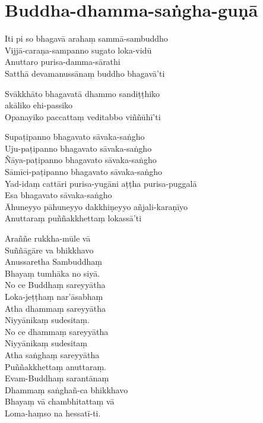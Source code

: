 \section{Buddha-dhamma-saṅgha-guṇā}


\begin{paritta}

Iti pi so bhagavā arahaṃ sammā-sambuddho\\
Vijjā-caraṇa-sampanno sugato loka-vidū\\
Anuttaro purisa-damma-sārathi\\
Satthā devamanussānaṃ buddho bhagavā'ti

Svākkhāto bhagavatā dhammo sandiṭṭhiko\\
\vin akāliko ehi-passiko\\
Opanayiko paccattaṃ veditabbo viññūhī'ti

Supaṭipanno bhagavato sāvaka-saṅgho\\
Uju-paṭipanno bhagavato sāvaka-saṅgho\\
Ñāya-paṭipanno bhagavato sāvaka-saṅgho\\
Sāmīci-paṭipanno bhagavato sāvaka-saṅgho\\
Yad-idaṃ cattāri purisa-yugāni aṭṭha purisa-puggalā\\
Esa bhagavato sāvaka-saṅgho\\
Āhuneyyo pāhuneyyo dakkhiṇeyyo añjali-karaṇīyo\\
Anuttaraṃ puññakkhettaṃ lokassā'ti

\sidepar{\pointerMark}%
Araññe rukkha-mūle vā\\
Suññāgāre va bhikkhavo\\
Anussaretha Sambuddhaṃ\\
Bhayaṃ tumhāka no siyā.\\
No ce Buddhaṃ sareyyātha\\
Loka-jeṭṭhaṃ nar'āsabhaṃ\\
Atha dhammaṃ sareyyātha\\
Niyyānikaṃ sudesitaṃ.\\
No ce dhammaṃ sareyyātha\\
Niyyānikaṃ sudesitaṃ\\
Atha saṅghaṃ sareyyātha\\
Puññakkhettaṃ anuttaraṃ.\\
Evam-Buddhaṃ sarantānaṃ\\
Dhammaṃ saṅghañ-ca bhikkhavo\\
Bhayaṃ vā chambhitattaṃ vā\\
Loma-haṃso na hessatī-ti.


\end{paritta}

